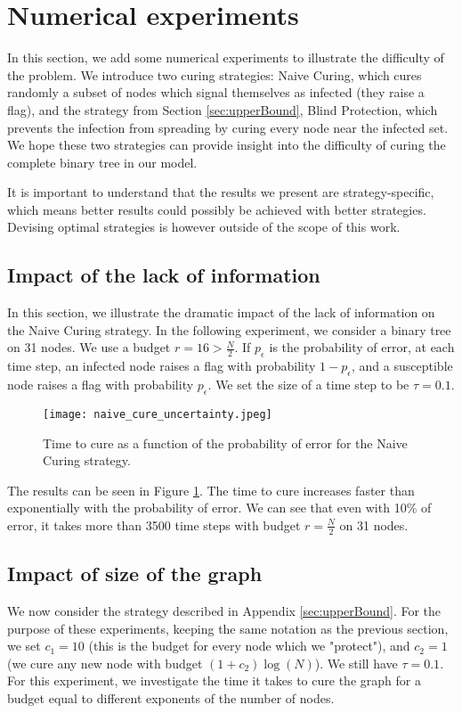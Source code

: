 \section{Numerical experiments} \label{sec:experiments}
In this section, we add some numerical experiments to illustrate the difficulty of the problem. We introduce two curing strategies: Naive Curing, which cures randomly a subset of nodes which signal themselves as infected (they raise a flag), and the strategy from Section \ref{sec:upperBound}, Blind Protection, which prevents the infection from spreading by curing every node near the infected set. We hope these two strategies can provide insight into the difficulty of curing the complete binary tree in our model. 

It is important to understand that the results we present are strategy-specific, which means better results could possibly be achieved with better strategies. Devising optimal strategies is however outside of the scope of this work.

\subsection{Impact of the lack of information}
In this section, we illustrate the dramatic impact of the lack of information on the Naive Curing strategy. In the following experiment, we consider a binary tree on 31 nodes. We use a budget $r = 16>\frac{N}{2}$. If $p_\epsilon$ is the probability of error, at each time step, an infected node raises a flag with probability $1 - p_\epsilon$, and a susceptible node raises a flag with probability $p_\epsilon$. We set the size of a time step to be $\tau = 0.1$.

\begin{figure}[H]
	\centering\texttt{[image: naive\_cure\_uncertainty.jpeg]}
	\caption{Time to cure as a function of the probability of error for the Naive Curing strategy.}
	\label{fig:naive}
\end{figure}

The results can be seen in Figure \ref{fig:naive}. The time to cure increases faster than exponentially with the probability of error. We can see that even with 10\% of error, it takes more than 3500 time steps with budget $r= \frac{N}{2}$ on 31 nodes.

\subsection{Impact of size of the graph}
We now consider the strategy described in Appendix \ref{sec:upperBound}. For the purpose of these experiments, keeping the same notation as the previous section, we set $c_1 = 10$ (this is the budget for every node which we "protect"), and $c_2 = 1$ (we cure any new node with budget $(1+c_2)\log(N)$). We still have $\tau = 0.1$. For this experiment, we investigate the time it takes to cure the graph for a budget equal to different exponents of the number of nodes.

